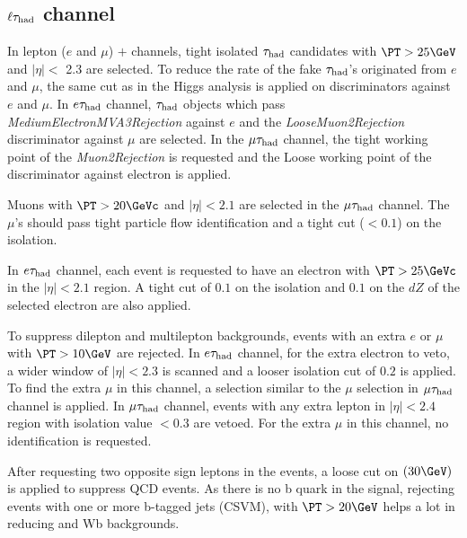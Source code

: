\subsection{\texorpdfstring{$\ell\tau_{\rm had}$ channel}{lepton-tau channel}}
\label{sect:leptonTauCuts}
In lepton ($e$ and $\mu$) $+$ \Tau channels, tight isolated $\tau_{\rm had}$ candidates with $\PT > 25 \GeV$ and $|\eta| <$ 2.3 are selected. To reduce the rate of the fake $\tau_{\rm had}$'s originated from $e$ and $\mu$, the same cut as in the Higgs analysis \cite{CMS_AN_2013-171} is applied on discriminators against $e$ and $\mu$. In $e\tau_{\rm had}$ channel, $\tau_{\rm had}$ objects which pass \emph{MediumElectronMVA3Rejection} against $e$ and the \emph{LooseMuon2Rejection} discriminator against $\mu$ are selected. In the $\mu\tau_{\rm had}$ channel, the tight working point of the \emph{Muon2Rejection} is requested and the Loose working point of the discriminator against electron is applied.

Muons with $\PT > 20 \GeVc$ and $|\eta|<2.1$ are selected in the $\mu\tau_{\rm had}$ channel. The $\mu$'s should pass tight particle flow identification and a tight cut ($<0.1$) on the isolation.
 
In $e\tau_{\rm had}$ channel, each event is requested to have an electron with $\PT >25 \GeVc$ in the $|\eta| < 2.1 $ region. A tight cut of $0.1$ on the isolation and $0.1$ on the $dZ$ of the selected electron are also applied.

To suppress dilepton and multilepton backgrounds, events with an extra $e$ or $\mu$ with $\PT >10 \GeV$ are rejected. In $e\tau_{\rm had}$ channel, for the extra electron to veto, a wider window of $|\eta|<2.3$ is scanned and a looser isolation cut of $0.2$ is applied. To find the extra $\mu$ in this channel, a selection similar to the $\mu$ selection in $\mu\tau_{\rm had}$ channel is applied. In $\mu\tau_{\rm had}$ channel, events with any extra lepton in $|\eta|<2.4$ region with isolation value $<0.3$ are vetoed. For the extra $\mu$ in this channel, no identification is requested.


After requesting two opposite sign leptons in the events, a loose cut on \MET $(30 \GeV)$ is applied to suppress QCD events. As there is no b quark in the signal, rejecting events with one or more b-tagged jets (CSVM), with $\PT > 20 \GeV$ helps a lot in reducing \ttbar and Wb backgrounds.

